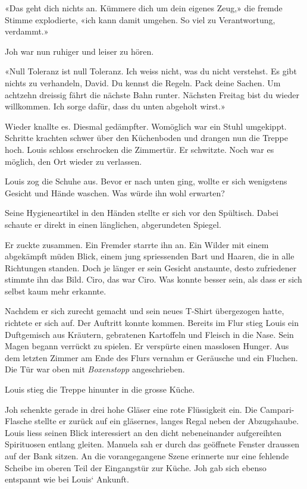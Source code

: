 «Das geht dich nichts an. Kümmere dich um dein eigenes Zeug,» die fremde
Stimme explodierte, «ich kann damit umgehen. So viel zu Verantwortung,
verdammt.»

Joh war nun ruhiger und leiser zu hören.

«Null Toleranz ist null Toleranz. Ich weiss nicht, was du nicht
verstehst. Es gibt nichts zu verhandeln, David. Du kennst die Regeln.
Pack deine Sachen. Um achtzehn dreissig fährt die nächste Bahn runter.
Nächsten Freitag bist du wieder willkommen. Ich sorge dafür, dass du
unten abgeholt wirst.»

Wieder knallte es. Diesmal gedämpfter. Womöglich war ein Stuhl
umgekippt. Schritte krachten schwer über den Küchenboden und drangen nun
die Treppe hoch. Louis schloss erschrocken die Zimmertür. Er schwitzte.
Noch war es möglich, den Ort wieder zu verlassen.

Louis zog die Schuhe aus. Bevor er nach unten ging, wollte er sich
wenigstens Gesicht und Hände waschen. Was würde ihn wohl erwarten?

Seine Hygieneartikel in den Händen stellte er sich vor den Spültisch.
Dabei schaute er direkt in einen länglichen, abgerundeten Spiegel.

Er zuckte zusammen. Ein Fremder starrte ihn an. Ein Wilder mit einem
abgekämpft müden Blick, einem jung spriessenden Bart und Haaren, die in
alle Richtungen standen. Doch je länger er sein Gesicht anstaunte, desto
zufriedener stimmte ihn das Bild. Ciro, das war Ciro. Was konnte besser
sein, als dass er sich selbst kaum mehr erkannte.

Nachdem er sich zurecht gemacht und sein neues T-Shirt übergezogen
hatte, richtete er sich auf. Der Auftritt konnte kommen. Bereits im Flur
stieg Louis ein Duftgemisch aus Kräutern, gebratenen Kartoffeln und
Fleisch in die Nase. Sein Magen begann verrückt zu spielen. Er verspürte
einen masslosen Hunger. Aus dem letzten Zimmer am Ende des Flurs vernahm
er Geräusche und ein Fluchen. Die Tür war oben mit \emph{Boxenstopp}
angeschrieben.

Louis stieg die Treppe hinunter in die grosse Küche.

Joh schenkte gerade in drei hohe Gläser eine rote Flüssigkeit ein. Die
Campari-Flasche stellte er zurück auf ein gläsernes, langes Regal neben
der Abzugshaube. Louis liess seinen Blick interessiert an den dicht
nebeneinander aufgereihten Spirituosen entlang gleiten. Manuela sah er
durch das geöffnete Fenster draussen auf der Bank sitzen. An die
vorangegangene Szene erinnerte nur eine fehlende Scheibe im oberen Teil
der Eingangstür zur Küche. Joh gab sich ebenso entspannt wie bei Louis`
Ankunft.

